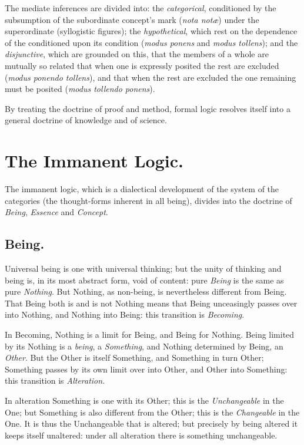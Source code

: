 \documentclass[12pt]{book}
\begin{document}
The mediate inferences are divided into: the \emph{categorical},
conditioned by the subsumption of the subordinate concept's mark
(\textit{nota notæ}) under the superordinate (syllogistic figures);
the \emph{hypothetical}, which rest on the dependence of the
conditioned upon its condition (\textit{modus ponens} and
\textit{modus tollens}); and the \emph{disjunctive}, which are
grounded on this, that the members of a whole are mutually so related
that when one is expressly posited the rest are excluded
(\textit{modus ponendo tollens}), and that when the rest are excluded
the one remaining must be posited (\textit{modus tollendo ponens}).

By treating the doctrine of proof and method, formal logic resolves
itself into a general doctrine of knowledge and of science.

\section*{The Immanent Logic.}

The immanent logic, which is a dialectical development of the system
of the categories (the thought-forms inherent in all being), divides
into the doctrine of \emph{Being}, \emph{Essence} and \emph{Concept}.

\subsection*{Being.}

Universal being is one with universal thinking; but the unity of
thinking and being is, in its most abstract form, void of content:
pure \emph{Being} is the same as pure \emph{Nothing}. But Nothing, as
non-being, is nevertheless different from Being. That Being both is
and is not Nothing means that Being unceasingly passes over into
Nothing, and Nothing into Being: this transition is \emph{Becoming}.

In Becoming, Nothing is a limit for Being, and Being for Nothing.
Being limited by its Nothing is a \emph{being}, a \emph{Something},
and Nothing determined by Being, an \emph{Other}. But the Other is
itself Something, and Something in turn Other; Something passes by
its own limit over into Other, and Other into Something: this
transition is \emph{Alteration}.

In alteration Something is one with its Other; this is the
\emph{Unchangeable} in the One; but Something is also different from
the Other; this is the \emph{Changeable} in the One. It is thus the
Unchangeable that is altered; but precisely by being altered it keeps
itself unaltered: under all alteration there is something
unchangeable.
\end{document}
